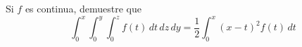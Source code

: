 \item Si $f$ es continua, demuestre que
    \[ \int_0^x \int_0^y \int_0^z f(t) \, dt \, dz \, dy = \frac{1}{2} \int_0^x (x - t)^2 f(t) \, dt \]
